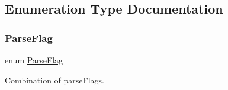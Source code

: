 \subsection{Enumeration Type Documentation}
\mbox{\label{a00563_ab7be7dabe6ffcba60fad441505583450}} 
\subsubsection{\texorpdfstring{Parse\+Flag}{ParseFlag}}
{\footnotesize\ttfamily enum \hyperlink{a00563_ab7be7dabe6ffcba60fad441505583450}{Parse\+Flag}}



Combination of parse\+Flags. 

